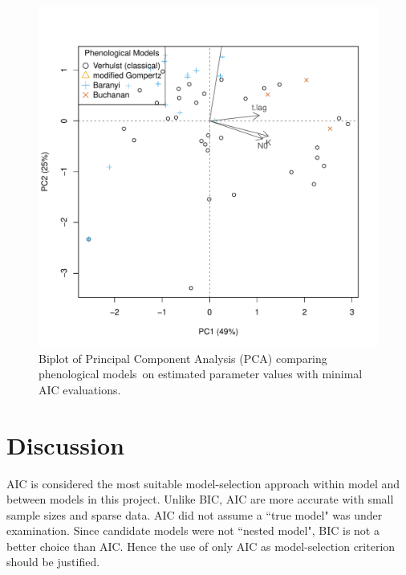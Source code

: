 \documentclass[a4paper, 11pt]{article}
\newcommand{\pms}{phenological models}
\begin{document}
	 \begin{figure}[h]
	 	\centering
	 	\includegraphics[width=.7\linewidth]{../results/Log_PCA.pdf}
	 	\caption{Biplot of Principal Component Analysis (PCA) comparing \pms\ on estimated parameter values with minimal AIC evaluations.}\label{biptPCA}
	 \end{figure}
	
	\section*{Discussion}
	
	AIC is considered the most suitable model-selection approach within model and between models in this project.  Unlike BIC, AIC are more accurate with small sample sizes\autocite{acquah2010comparison,kuha2004aic} and sparse data\autocite{kuha2004aic}.  AIC did not assume a ``true model" was under examination\autocite{aho2014model,vrieze2012model,yang2005can}.  Since candidate models were not ``nested model", BIC is not a better choice than AIC\autocite{wang2006comparison}.  Hence the use of only AIC as model-selection criterion should be justified.\\
	
\end{document}
